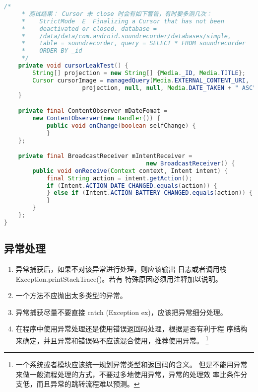 \documentclass[a4paper,12pt]{article}
\begin{document}
\begin{lstlisting}[language=java,basicstyle=\scriptsize,caption=内存泄漏示例]
    /*
     * 测试结果： Cursor 未 close 时会有如下警告，有时要多测几次：
     *    StrictMode  E  Finalizing a Cursor that has not been 
     *    deactivated or closed. database = 
     *    /data/data/com.android.soundrecorder/databases/simple,
     *    table = soundrecorder, query = SELECT * FROM soundrecorder
     *    ORDER BY _id
     */ 
    private void cursorLeakTest() {
        String[] projection = new String[] {Media._ID, Media.TITLE};
        Cursor cursorImage = managedQuery(Media.EXTERNAL_CONTENT_URI, 
                      projection, null, null, Media.DATE_TAKEN + " ASC");
    }

    private final ContentObserver mDateFomat = 
        new ContentObserver(new Handler()) {
            public void onChange(boolean selfChange) {
            }
    };

    private final BroadcastReceiver mIntentReceiver = 
                                        new BroadcastReceiver() {
        public void onReceive(Context context, Intent intent) {
            final String action = intent.getAction();
            if (Intent.ACTION_DATE_CHANGED.equals(action)) {
            } else if (Intent.ACTION_BATTERY_CHANGED.equals(action)) {
            }
        }
    };
}
\end{lstlisting}

\subsection{异常处理}
\begin{enumerate}
    \item 异常捕获后，如果不对该异常进行处理，则应该输出
        日志或者调用栈Exception.printStackTrace()。若有
        特殊原因必须用注释加以说明。
    \item 一个方法不应抛出太多类型的异常。
    \item 异常捕获尽量不要直接 catch (Exception ex)，应该把异常细分处理。
    \item 在程序中使用异常处理还是使用错误返回码处理，根据是否有利于程
        序结构来确定，并且异常和错误码不应该混合使用，推荐使用异常。
        \footnote{一个系统或者模块应该统一规划异常类型和返回码的含义。 
        但是不能用异常来做一般流程处理的方式，不要过多地使用异常，异常的处理效
        率比条件分支低，而且异常的跳转流程难以预测。}
\end{enumerate}
\end{document}

